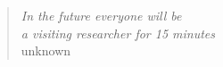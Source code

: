 \begin{quote}
\begin{flushright}
\null {}
\emph{In the future everyone will be \\
  a visiting researcher for 15 minutes}\\
  unknown
\null
\end{flushright}
\end{quote}
